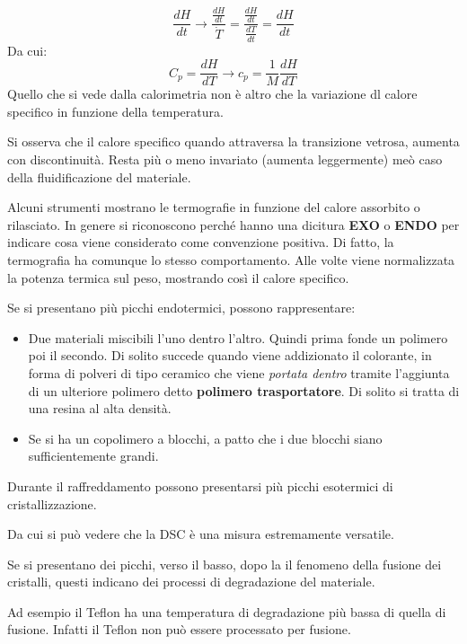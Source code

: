 \begin{equation}
\frac{dH}{dt} \rightarrow \frac{\frac{dH}{dt}}{\dot{T}} = \frac{\frac{dH}{dt}}{\frac{dT}{dt}} = \frac{dH}{dt}
\end{equation}
Da cui:
\begin{equation}
C_p = \frac{dH}{dT} \rightarrow c_p = \frac{1}{M}\frac{dH}{dT}
\end{equation}
Quello che si vede dalla calorimetria non è altro che la variazione dl calore specifico in funzione della temperatura.

Si osserva che il calore specifico quando attraversa la transizione vetrosa, aumenta con discontinuità. Resta più o meno invariato (aumenta leggermente) meò caso della fluidificazione del materiale.

Alcuni strumenti mostrano le termografie in funzione del calore assorbito o rilasciato. In genere si riconoscono perché hanno una dicitura \textbf{EXO} o \textbf{ENDO} per indicare cosa viene considerato come convenzione positiva.
Di fatto, la termografia ha comunque lo stesso comportamento.
Alle volte viene normalizzata la potenza termica sul peso, mostrando così il calore specifico.

Se si presentano più picchi endotermici, possono rappresentare:
\begin{itemize}
\item Due materiali miscibili l'uno dentro l'altro. Quindi prima fonde un polimero poi il secondo. Di solito succede quando viene addizionato il colorante, in forma di polveri di tipo ceramico che viene \textit{portata dentro} tramite l'aggiunta di un ulteriore polimero detto \textbf{polimero trasportatore}. Di solito si tratta di una resina al alta densità.
\item Se si ha un copolimero a blocchi, a patto che i due blocchi siano sufficientemente grandi.
\end{itemize}

Durante il raffreddamento possono presentarsi più picchi esotermici di cristallizzazione.

Da cui si può vedere che la \ac{DSC} è una misura estremamente versatile.

Se si presentano dei picchi, verso il basso, dopo la il fenomeno della fusione dei cristalli, questi indicano dei processi di degradazione del materiale.

Ad esempio il Teflon ha una temperatura di degradazione più bassa di quella di fusione. Infatti il Teflon non può essere processato per fusione.

